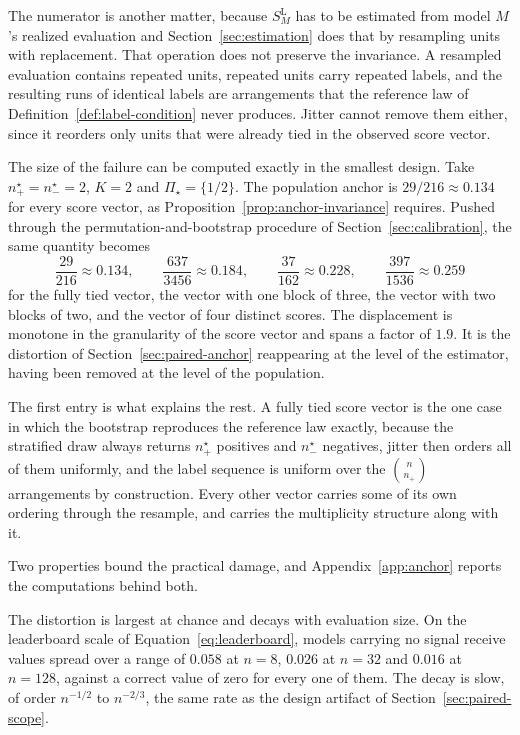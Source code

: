 \documentclass[11pt]{article}
\newcommand{\PSet}{\Pi_\star}
\newcommand{\SLead}{S^{\mathrm{L}}}
\theoremstyle{remark}
\begin{document}
The numerator is another matter, because $\SLead_M$ has to be estimated from model $M$'s realized evaluation and Section~\ref{sec:estimation} does that by resampling units with replacement. That operation does not preserve the invariance. A resampled evaluation contains repeated units, repeated units carry repeated labels, and the resulting runs of identical labels are arrangements that the reference law of Definition~\ref{def:label-condition} never produces. Jitter cannot remove them either, since it reorders only units that were already tied in the observed score vector.

The size of the failure can be computed exactly in the smallest design. Take $n^\star_+=n^\star_-=2$, $K=2$ and $\PSet=\{1/2\}$. The population anchor is $29/216\approx0.134$ for every score vector, as Proposition~\ref{prop:anchor-invariance} requires. Pushed through the permutation-and-bootstrap procedure of Section~\ref{sec:calibration}, the same quantity becomes
\[
\frac{29}{216}\approx0.134,
\qquad
\frac{637}{3456}\approx0.184,
\qquad
\frac{37}{162}\approx0.228,
\qquad
\frac{397}{1536}\approx0.259
\]
for the fully tied vector, the vector with one block of three, the vector with two blocks of two, and the vector of four distinct scores. The displacement is monotone in the granularity of the score vector and spans a factor of $1.9$. It is the distortion of Section~\ref{sec:paired-anchor} reappearing at the level of the estimator, having been removed at the level of the population.

The first entry is what explains the rest. A fully tied score vector is the one case in which the bootstrap reproduces the reference law exactly, because the stratified draw always returns $n^\star_+$ positives and $n^\star_-$ negatives, jitter then orders all of them uniformly, and the label sequence is uniform over the $\binom{n}{n_+}$ arrangements by construction. Every other vector carries some of its own ordering through the resample, and carries the multiplicity structure along with it.

Two properties bound the practical damage, and Appendix~\ref{app:anchor} reports the computations behind both.

The distortion is largest at chance and decays with evaluation size. On the leaderboard scale of Equation~\eqref{eq:leaderboard}, models carrying no signal receive values spread over a range of $0.058$ at $n=8$, $0.026$ at $n=32$ and $0.016$ at $n=128$, against a correct value of zero for every one of them. The decay is slow, of order $n^{-1/2}$ to $n^{-2/3}$, the same rate as the design artifact of Section~\ref{sec:paired-scope}.
\end{document}

